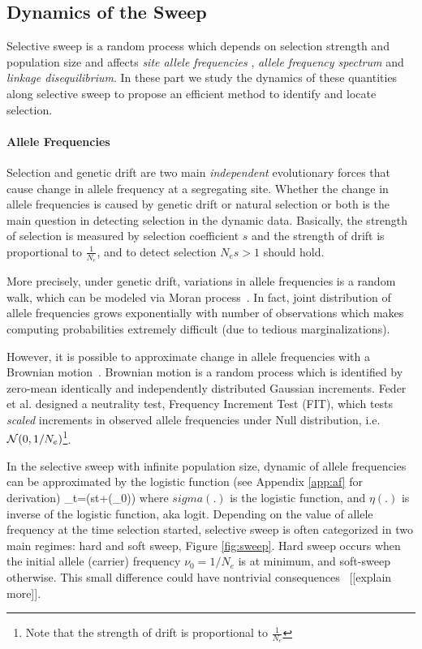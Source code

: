 \documentclass[11pt]{article}
\begin{document}
\subsection{Dynamics of the Sweep}
Selective sweep is a random process which depends on selection strength
 and population size and affects \emph{site allele frequencies} , \emph{allele 
 frequency spectrum} and \emph{linkage disequilibrium}.
 In these part we study the dynamics of these quantities along selective sweep 
 to propose an efficient method to identify and locate selection.
\paragraph{Allele Frequencies}
Selection and genetic drift are two main \emph{independent} evolutionary forces 
that cause change in allele frequency at a segregating site.
 Whether the change in allele frequencies is caused by genetic drift or natural
  selection or both is the main question in detecting selection in the dynamic
   data. Basically, the strength of selection is measured by selection 
   coefficient $s$ and the strength of drift is proportional to 
   $\frac{1}{N_e}$, and to detect selection $N_es>1$ should hold.
  

More precisely, under genetic drift, variations in allele frequencies is a 
random walk, which can be modeled via Moran process~\cite{moran1962statistical}.
In fact, joint distribution of allele frequencies grows exponentially with 
number of observations which makes computing probabilities extremely difficult 
(due to tedious marginalizations).

However, it is possible to approximate change in allele frequencies
with a Brownian motion~\cite{Ewens2012Mathematical}. 
Brownian motion is a random process which is identified by zero-mean 
identically and independently distributed Gaussian increments. Feder et al. 
\cite{feder2014Identifying} designed a neutrality test, Frequency Increment 
Test (FIT), which tests \emph{scaled} increments in observed allele frequencies 
under Null distribution, i.e. ${\cal N}(0,1/N_e)$\footnote{Note that the strength of 
drift is proportional to $\frac{1}{N_e}$}.

In the selective sweep with infinite population size, dynamic of allele frequencies 
can be approximated by the logistic function (see Appendix \ref{app:af} for 
derivation)
\beq
\nu_t=\sigma(st+\eta(\nu_0))\label{eq:nut}
\eeq
where $sigma(.)$ is the logistic function, and $\eta(.)$ is inverse of the 
logistic 
function, aka logit.
Depending on the 
value of allele frequency at the time selection started, selective sweep is often 
categorized in two main regimes: hard and soft sweep, Figure \ref{fig:sweep}. 
Hard sweep occurs when the initial allele (carrier) frequency $\nu_0=1/N_e$ is 
at 
minimum, and soft-sweep otherwise. This small difference could have nontrivial
consequences~\cite{schrider2015soft} [[explain more]].
\end{document}
